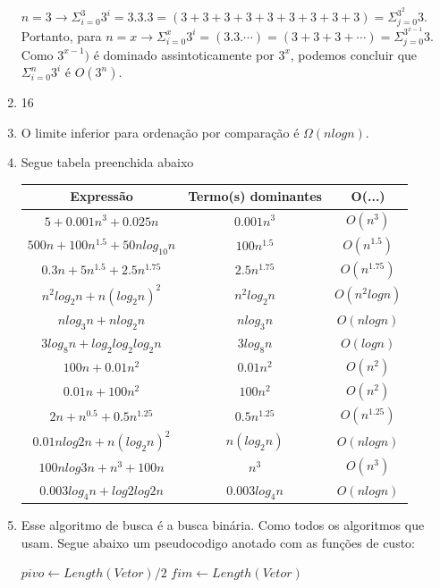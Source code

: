 \documentclass[11pt]{article}
\begin{document}
\begin{enumerate}
$n = 3 \rightarrow \Sigma_{i=0}^3 3^i = 3.3.3 = (3+3+3+3+3+3+3+3+3) = \Sigma_{j=0}^{3^2} 3$. Portanto, para 
$n = x \rightarrow \Sigma_{i=0}^x 3^i = (3.3.\dotsm)= (3+3+3+\dotsm) = \Sigma_{j=0}^{3^{x-1}} 3$.
Como $3^{x-1})$ é dominado assintoticamente por $3^x$, podemos concluir que $\Sigma_{i=0}^n 3^i$ é $O(3^n)$.
    \item 16
    \item O limite inferior para ordenação por comparação é $\Omega(n logn)$.
    \item  Segue tabela preenchida abaixo \\
        \begin{tabular}{|c|c|c|}
        Express\~ao & Termo(s) dominantes & O(...) \\ \hline
        $5 + 0.001n^3 + 0.025n$ & $0.001n^3$ & $O(n^3)$ \\ \hline
        $500n + 100n^{1.5} + 50n log_{10} n$ & $100n^{1.5}$ & $O(n^{1.5})$ \\ \hline
        $0.3n + 5n^{1.5} + 2.5n^{1.75}$ & $2.5n^{1.75}$ & $O(n^{1.75})$ \\ \hline
        $n^2 log_2 n + n(log_2 n)^2$ & $n^2 log_2 n$ & $O(n^2 log n)$ \\ \hline
        $n log_3 n + n log_2 n$ & $n log_3n$ & $O(nlogn)$ \\ \hline
        $3 log_8 n + log_2 log_2 log_2 n$ & $3log_8n$ & $O(logn)$ \\ \hline
        $100n + 0.01n^2$ & $0.01n^2$ & $O(n^2)$ \\ \hline
        $0.01n + 100n^2$ & $100n^2$ & $O(n^2) $ \\ \hline
        $2n + n^{0.5} + 0.5n^{1.25} $ & $0.5n^{1.25}$ & $O(n^{1.25})$ \\ \hline
        $0.01n log2 n + n(log_2 n)^2$ & $n(log_2 n) $ & $O(nlogn)$ \\ \hline
        $100nlog3n + n^3 + 100n$ & $n^3$ & $O(n^3)$ \\ \hline
        $0.003 log_4 n + log2 log2 n$ & $0.003 log_4 n$ & $O(nlogn)$ \\ \hline  
        \end{tabular}
    \item Esse algoritmo de busca é a busca binária. Como todos os algoritmos que usam. Segue abaixo um pseudocodigo anotado com as funções de custo:
        \begin{algorithmic}[1]
                \State $pivo \gets Length(Vetor)/2$ 
                \State $fim \gets Length(Vetor)$ 

\end{algorithmic}
\end{enumerate}
\end{document}
